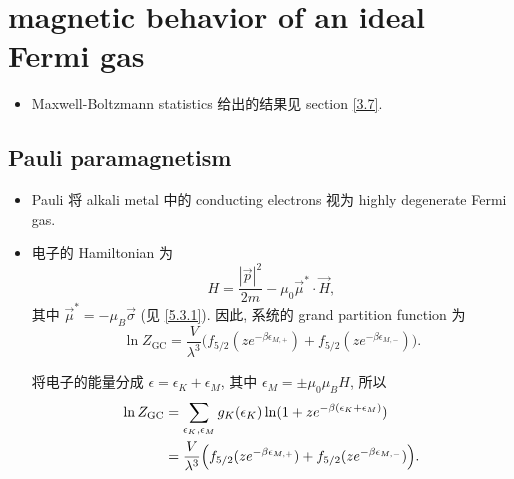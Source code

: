 \section{magnetic behavior of an ideal Fermi gas}
\begin{itemize}
	\item Maxwell-Boltzmann statistics 给出的结果见 section \ref{3.7}.
\end{itemize}

\subsection{Pauli paramagnetism}
\begin{itemize}
	\item Pauli 将 alkali metal 中的 conducting electrons 视为 highly degenerate Fermi gas.
	
	\item 电子的 Hamiltonian 为
	\begin{equation}
		H = \frac{|\vec{p}|^2}{2 m} - \mu_0 \vec{\mu}^* \cdot \vec{H},
	\end{equation}
	其中 $\vec{\mu}^* = - \mu_B \vec{\sigma}$ (见 \eqref{5.3.1}). 因此, 系统的 grand partition function 为
	\begin{equation}
		\ln Z_\text{GC} = \frac{V}{\lambda^3} \Big( f_{5 / 2}(z e^{- \beta \epsilon_{M, +}}) + f_{5 / 2}(z e^{- \beta \epsilon_{M, -}}) \Big).
	\end{equation}
	
	\begin{tcolorbox}[title=calculation:]
		将电子的能量分成 $\epsilon = \epsilon_K + \epsilon_M$, 其中 $\epsilon_M = \pm \mu_0 \mu_B H$, 所以
		\begin{align}
			\ln Z_\text{GC} &= \sum_{\epsilon_K, \epsilon_M} g_K(\epsilon_K) \ln(1 + z e^{- \beta (\epsilon_K + \epsilon_M)}) \notag \\
			&= \frac{V}{\lambda^3} \Big( f_{5 / 2}(z e^{- \beta \epsilon_{M, +}}) + f_{5 / 2}(z e^{- \beta \epsilon_{M, -}}) \Big).
		\end{align}
	\end{tcolorbox}
	

\end{itemize}

